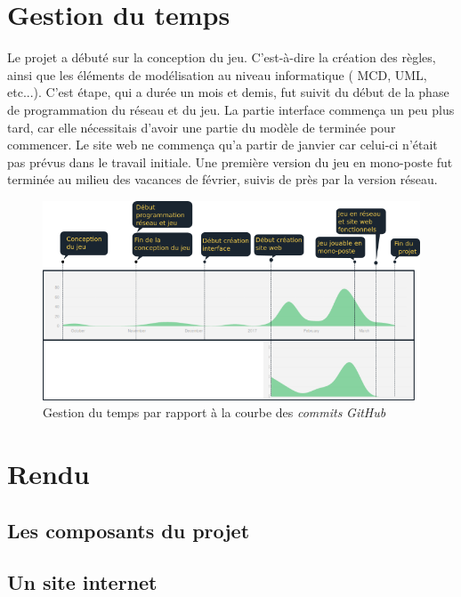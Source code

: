 \documentclass[a4paper, titlepage]{livret}
\begin{document}
    
  \section{Gestion du temps}
    Le projet a débuté sur la conception du jeu. C'est-à-dire la création des règles, ainsi que les éléments de modélisation au niveau informatique ( MCD, UML, etc...).  C'est étape, qui a durée un mois et demis, fut suivit du début de la phase de programmation du réseau et du jeu. La partie interface commença un peu plus tard, car elle nécessitais d'avoir une partie du modèle de terminée pour commencer. Le site web ne commença qu'a partir de janvier car celui-ci n'était pas prévus dans le travail initiale. Une première version du jeu en mono-poste fut terminée au milieu des vacances de février, suivis de près par la version réseau.
    \begin{figure}[th]
      \begin{center}
        \includegraphics[scale=0.5]{Assets/gestionTemps.png}
        \caption{Gestion du temps par rapport à la courbe des \textit{commits} \textit{GitHub}}
        \label{RepTime}
      \end{center}
    \end{figure}
  


\section{Rendu}
\subsection{Les composants du projet}



	\subsection{Un site internet}
\end{document}
